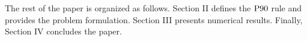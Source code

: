 \documentclass[conference]{IEEEtran}
\begin{document}





The rest of the paper is organized as follows. Section II defines the $\rm{P90}$ rule and provides the problem formulation. Section III presents numerical results. Finally, Section IV concludes the paper. 

\end{document}
